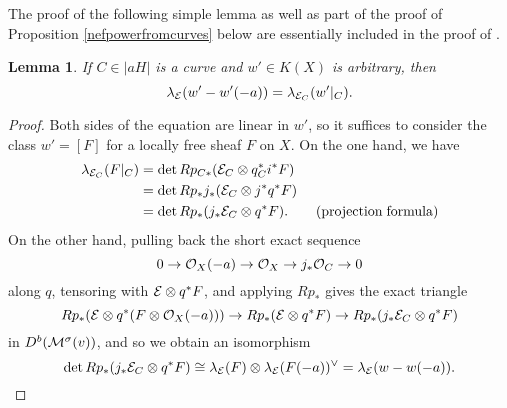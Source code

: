 \documentclass[letterpaper,12pt]{amsart}
\newtheorem{lem}[thm]{Lemma}
\theoremstyle{remark}
\begin{document}
The proof of the following simple lemma as well as part of the proof of Proposition \ref{nefpowerfromcurves} below are essentially included in the proof of \cite[Proposition 8.2.3]{HL}.

\begin{lem}\label{Ktheorylemma}
    If $C \in |a H|$ is a curve and $w' \in K(X)$ is arbitrary, then
    \[ \lambda_{\mathcal{E}}(w' - w'(-a)) = \lambda_{\mathcal{E}_C}(w'|_C). \]
\end{lem}
\begin{proof}
    Both sides of the equation are linear in $w'$, so it suffices to consider the class $w' = [F]$ for a locally free sheaf $F$ on $X$. On the one hand, we have
    \begin{align*}
        \lambda_{\mathcal{E}_C}(F|_C) & = \det R p_{C*}(\mathcal{E}_C \otimes q_C^* i^* F) \\
        & = \det R p_* j_*(\mathcal{E}_C \otimes j^* q^* F) \\
        & = \det R p_* (j_*\mathcal{E}_C \otimes q^* F). \qquad \mathrm{(projection\;formula)}
    \end{align*}
    On the other hand, pulling back the short exact sequence 
    \[ 0 \to \mathcal{O}_X(-a) \to \mathcal{O}_X \to j_* \mathcal{O}_C \to 0 \]
    along $q$, tensoring with $\mathcal{E} \otimes q^* F$, and applying $R p_*$ gives the exact triangle
    \[ R p_* (\mathcal{E} \otimes q^*(F \otimes \mathcal{O}_X(-a))) \to R p_* (\mathcal{E} \otimes q^*F) \to R p_* (j_* \mathcal{E}_C \otimes q^*F) \]
    in $D^b(\mathcal{M}^\sigma(v))$, and so we obtain an isomorphism
    \[ \det R p_* (j_* \mathcal{E}_C \otimes q^*F) \cong \lambda_{\mathcal{E}}(F) \otimes \lambda_{\mathcal{E}}(F(-a))^\vee = \lambda_{\mathcal{E}}(w - w(-a)). \]
\end{proof}
\end{document}
